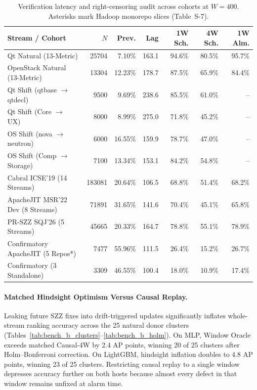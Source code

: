 \documentclass[pdflatex,sn-basic]{sn-jnl}
\theoremstyle{definition}
\theoremstyle{plain}
\begin{document}
\begin{table}[t]
\centering
\caption{Verification latency and right-censoring audit across cohorts at $W=400$. Asterisks mark Hadoop monorepo slices (Table~S-7).}
\label{tab:audit_censoring}
\fontsize{7.5}{9.0}\selectfont
\setlength{\tabcolsep}{2.0pt}
\begin{tabular*}{\textwidth}{@{\extracolsep\fill}lrrrrrr@{}}
\toprule
\textbf{Stream / Cohort} & \textbf{$N$} & \textbf{Prev.} & \textbf{Lag} & \textbf{1W Sch.} & \textbf{4W Sch.} & \textbf{1W Alm.} \\
\midrule
Qt Natural (13-Metric) & 25704 & 7.10\% & 163.1 & 94.6\% & 80.5\% & 95.7\% \\
OpenStack Natural (13-Metric) & 13304 & 12.23\% & 178.7 & 87.5\% & 65.9\% & 84.4\% \\
Qt Shift (qtbase $\to$ qtdecl) & 9500 & 9.69\% & 238.6 & 85.5\% & 61.0\% & -- \\
Qt Shift (Core $\to$ UX) & 8000 & 8.99\% & 275.0 & 71.8\% & 45.2\% & -- \\
OS Shift (nova $\to$ neutron) & 6000 & 16.55\% & 159.9 & 78.7\% & 47.0\% & -- \\
OS Shift (Comp $\to$ Storage) & 7100 & 13.34\% & 153.1 & 84.2\% & 54.8\% & -- \\
\midrule
Cabral ICSE'19 (14 Streams) & 183081 & 20.64\% & 106.5 & 68.8\% & 51.4\% & 68.2\% \\
ApacheJIT MSR'22 Dev (8 Streams) & 71891 & 31.65\% & 141.6 & 70.4\% & 45.1\% & 65.8\% \\
PR-SZZ SQJ'26 (5 Streams) & 45665 & 20.33\% & 164.7 & 78.8\% & 55.1\% & 78.9\% \\
Confirmatory ApacheJIT (5 Repos*) & 7477 & 55.96\% & 111.5 & 26.4\% & 15.2\% & 26.7\% \\
Confirmatory (3 Standalone) & 3309 & 46.55\% & 100.4 & 18.0\% & 10.9\% & 17.4\% \\
\bottomrule
\end{tabular*}
\vspace{2pt}\par{}
\end{table}

\paragraph{Matched Hindsight Optimism Versus Causal Replay.}
Leaking future SZZ fixes into drift-triggered updates significantly inflates whole-stream ranking accuracy across the 25 natural donor clusters (Tables~\ref{tab:bench_b_clusters}--\ref{tab:bench_b_holm}). On MLP, Window Oracle exceeds matched Causal-4W by 2.4 AP points, winning 20 of 25 clusters after Holm--Bonferroni correction. On LightGBM, hindsight inflation doubles to 4.8 AP points, winning 23 of 25 clusters. Restricting causal replay to a single window depresses accuracy further on both hosts because almost every defect in that window remains unfixed at alarm time.
\end{document}
